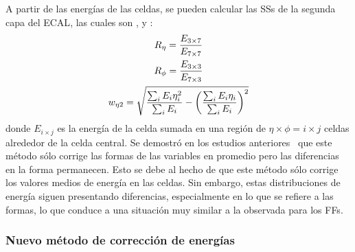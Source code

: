 A partir de las energías de las celdas, se pueden calcular las \acp{SS} de la segunda capa del \ac{ECAL}, las cuales son \reta, \rphi y \weta:
\begin{gather*}
    R_{\eta} = \frac{E_{3\times 7}}{E_{7\times 7}}\\
    R_{\phi} = \frac{E_{3\times 3}}{E_{7\times 3}}\\
    w_{\eta 2} = \sqrt{\frac{\sum_i E_i \eta^2_i}{\sum_i E_i} - \left( \frac{\sum_i E_i \eta_i}{\sum_i E_i} \right)^2}
\end{gather*}
donde \(E_{i\times j}\) es la energía de la celda sumada en una región de \(\eta\times\phi=i\times j\) celdas alrededor de la celda central. Se demostró en los estudios anteriores~\cite{thesis_belfkir} que este método sólo corrige las formas de las variables en promedio pero las diferencias en la forma permanecen. Esto se debe al hecho de que este método sólo corrige los valores medios de energía en las celdas. Sin embargo, estas distribuciones de energía siguen presentando diferencias, especialmente en lo que se refiere a las formas, lo que conduce a una situación muy similar a la observada para los \acp{FF}.
























\subsubsection{Nuevo método de corrección de energías}

